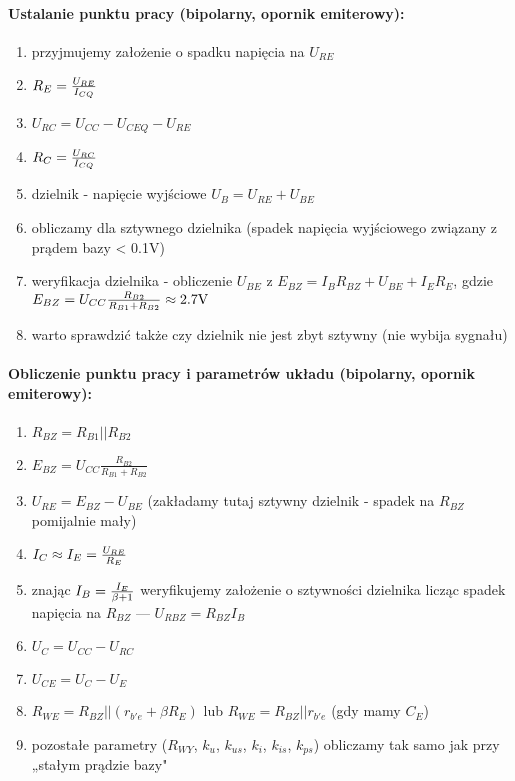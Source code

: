 \documentclass{pdfBooklets}
\begin{document}
\paragraph{Ustalanie punktu pracy (bipolarny, opornik emiterowy):}
\begin{enumerate}
	\item przyjmujemy założenie o spadku napięcia na $U_{RE}$
	\item $R_E = {U_{RE} \over I_{CQ}}$
	\item $U_{RC} = U_{CC} - U_{CEQ} - U_{RE}$
	\item $R_C = {U_{RC} \over I_{CQ}}$
	\item dzielnik - napięcie wyjściowe $U_B = U_{RE} + U_{BE}$
	\item obliczamy dla sztywnego dzielnika (spadek napięcia wyjściowego związany z prądem bazy < 0.1V)
	\item weryfikacja dzielnika - obliczenie $U_{BE}$ z $E_{BZ} = I_B R_{BZ} + U_{BE} + I_E R_E$, gdzie $E_{BZ} = U_{CC}\frac{R_{B2}}{R_{B1} + R_{B2}} \approx 2.7\rm{V}$
	\item warto sprawdzić także czy dzielnik nie jest zbyt sztywny (nie wybija sygnału)
\end{enumerate}

\paragraph{Obliczenie punktu pracy i parametrów układu (bipolarny, opornik emiterowy):}
\begin{enumerate}
	\item $R_{BZ} = R_{B1} || R_{B2}$
	\item $E_{BZ} = U_{CC}\frac{R_{B2}}{R_{B1} + R_{B2}}$
	\item $U_{RE} = E_{BZ} - U_{BE}$ (zakładamy tutaj sztywny dzielnik - spadek na $R_{BZ}$ pomijalnie mały)
	\item {\bf $I_C \approx I_E = {U_{RE} \over R_E}$}
	\item znając $I_B = {I_E \over \beta +1}$ weryfikujemy założenie o sztywności dzielnika licząc spadek napięcia na $R_{BZ}$ --- $U_{RBZ} = R_{BZ} I_B$
	\item $U_C = U_{CC} - U_{RC}$
	\item {\bf $U_{CE} = U_C - U_E$}
	\item $R_{WE} = R_{BZ} || (r_{b'e} + \beta R_E)$ lub $R_{WE} = R_{BZ} || r_{b'e}$ (gdy mamy $C_E$)
	\item pozostałe parametry ($R_{WY}$, $k_{u}$, $k_{us}$, $k_{i}$, $k_{is}$, $k_{ps}$) obliczamy tak samo jak przy „stałym prądzie bazy"
\end{enumerate}
\end{document}
